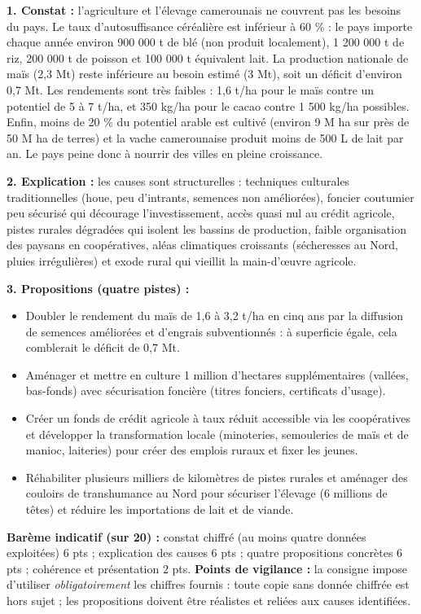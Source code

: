 \documentclass[11pt]{article}
\begin{document}
\begin{corrige}
\textbf{1. Constat :} l'agriculture et l'élevage camerounais ne couvrent pas les besoins du pays. Le taux d'autosuffisance céréalière est inférieur à 60 \% : le pays importe chaque année environ 900 000 t de blé (non produit localement), 1 200 000 t de riz, 200 000 t de poisson et 100 000 t équivalent lait. La production nationale de maïs (2,3 Mt) reste inférieure au besoin estimé (3 Mt), soit un déficit d'environ 0,7 Mt. Les rendements sont très faibles : 1,6 t/ha pour le maïs contre un potentiel de 5 à 7 t/ha, et 350 kg/ha pour le cacao contre 1 500 kg/ha possibles. Enfin, moins de 20 \% du potentiel arable est cultivé (environ 9 M ha sur près de 50 M ha de terres) et la vache camerounaise produit moins de 500 L de lait par an. Le pays peine donc à nourrir des villes en pleine croissance.

\textbf{2. Explication :} les causes sont structurelles : techniques culturales traditionnelles (houe, peu d'intrants, semences non améliorées), foncier coutumier peu sécurisé qui décourage l'investissement, accès quasi nul au crédit agricole, pistes rurales dégradées qui isolent les bassins de production, faible organisation des paysans en coopératives, aléas climatiques croissants (sécheresses au Nord, pluies irrégulières) et exode rural qui vieillit la main-d'œuvre agricole.

\textbf{3. Propositions (quatre pistes) :}
\begin{itemize}
\item Doubler le rendement du maïs de 1,6 à 3,2 t/ha en cinq ans par la diffusion de semences améliorées et d'engrais subventionnés : à superficie égale, cela comblerait le déficit de 0,7 Mt.
\item Aménager et mettre en culture 1 million d'hectares supplémentaires (vallées, bas-fonds) avec sécurisation foncière (titres fonciers, certificats d'usage).
\item Créer un fonds de crédit agricole à taux réduit accessible via les coopératives et développer la transformation locale (minoteries, semouleries de maïs et de manioc, laiteries) pour créer des emplois ruraux et fixer les jeunes.
\item Réhabiliter plusieurs milliers de kilomètres de pistes rurales et aménager des couloirs de transhumance au Nord pour sécuriser l'élevage (6 millions de têtes) et réduire les importations de lait et de viande.
\end{itemize}
\textbf{Barème indicatif (sur 20) :} constat chiffré (au moins quatre données exploitées) 6 pts ; explication des causes 6 pts ; quatre propositions concrètes 6 pts ; cohérence et présentation 2 pts. \textbf{Points de vigilance :} la consigne impose d'utiliser \emph{obligatoirement} les chiffres fournis : toute copie sans donnée chiffrée est hors sujet ; les propositions doivent être réalistes et reliées aux causes identifiées.
\end{corrige}
\end{document}
